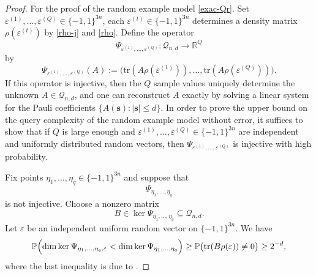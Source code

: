 \documentclass{amsbook}
\theoremstyle{definition}
\theoremstyle{remark}
\numberwithin{section}{chapter}
\numberwithin{equation}{chapter}
\newcommand{\1}{\mathbf{1}}
\newcommand{\s}{\mathbf{s}}
\begin{document}
\begin{proof}
	For the  proof of the random example model \eqref{exac-Qr}.  Set $\varepsilon^{(1)},\dots,\varepsilon^{(Q)}\in\{-1,1\}^{3n}$,  each \(\varepsilon^{(t)}\in\{-1,1\}^{3n}\) determines a density matrix  \(\rho(\varepsilon^{(t)})\) by \eqref{rho-j} and \eqref{rho}. Define the operator
	\[
	\Psi_{\varepsilon^{(1)},\dots,\varepsilon^{(Q)}}:
	\mathcal Q_{n,d}\to \mathbb R^Q
	\]
	by
	\[
	\Psi_{\varepsilon^{(1)},\dots,\varepsilon^{(Q)}}(A)
	:=
	\bigl(
	\mathrm{tr}(A\rho(\varepsilon^{(1)})),
	\dots,
	\mathrm{tr}(A\rho(\varepsilon^{(Q)}))
	\bigr).
	\]
	If this operator is injective, then the $Q$ sample values uniquely determine the unknown
	$A\in \mathcal Q_{n,d}$, and one can reconstruct $A$ exactly by solving a linear system
	for the Pauli coefficients $\{\widehat A(\s): |\s|\le d\}$.
	In order to prove the upper bound on the query complexity of the random example model without error, it suffices to show
	that if \(Q\) is large enough and $\varepsilon^{(1)},\dots,\varepsilon^{(Q)}\in\{-1,1\}^{3n}$ are independent and uniformly distributed random vectors, then $\Psi_{\varepsilon^{(1)},\dots,\varepsilon^{(Q)}}$ is injective with high
	probability.
	
	Fix points $\eta_1,\dots,\eta_q\in\{-1,1\}^{3n}$ and suppose that
	\[
	\Psi_{\eta_1,\dots,\eta_q}
	\]
	is not injective. Choose a nonzero matrix
	\[
	B\in \ker \Psi_{\eta_1,\dots,\eta_q}\subseteq \mathcal Q_{n,d}.
	\]
	Let $\varepsilon$ be an independent uniform random vector on $\{-1,1\}^{3n}$. We have
	\begin{equation}\label{p-2d}
	\mathbb{P}\Bigl(
	\dim \ker \Psi_{\eta_1,\dots,\eta_q,\varepsilon}
	<
	\dim \ker \Psi_{\eta_1,\dots,\eta_q}
	\Bigr)\geq
	\mathbb{P}\bigl(\mathrm{tr}(B\rho(\varepsilon))\neq 0\bigr)\ge 2^{-d},
	\end{equation}
	where the last inequality is due to \cite[Lemma 3.5]{ODo2014}.
	

\end{proof}
\end{document}
